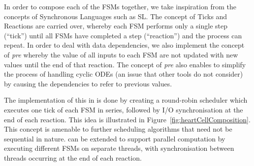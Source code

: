 In order to compose each of the \acp{FSM} together, we take inspiration from the concepts of Synchronous Languages such as SL\cite{SlLanguage}.
The concept of Ticks and Reactions are carried over, whereby each \ac{FSM} performs only a single step (``tick'') until all \acp{FSM} have completed a step (``reaction'') and the process can repeat.
In order to deal with data dependencies, we also implement the concept of \emph{pre} whereby the value of all inputs to each \ac{FSM} are not updated with new values until the end of that reaction.
The concept of \emph{pre} also enables \ourTool to simplify the process of handling cyclic \acp{ODE} (an issue that other tools do not consider\cite{kim2003modular}) by causing the dependencies to refer to previous values.

The implementation of this in \ourTool is done by creating a round-robin scheduler which executes one tick of each \ac{FSM} in series, followed by I/O synchronisation at the end of each reaction.
This idea is illustrated in Figure~\ref{fig:heartCellComposition}.
This concept is amenable to further scheduling algorithms that need not be sequential in nature.
\ourTool can be extended to support parallel computation by executing different \acp{FSM} on separate threads, with synchronisation between threads occurring at the end of each reaction.
